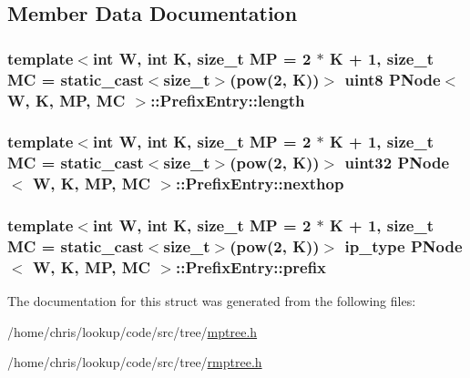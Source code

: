 \subsection{Member Data Documentation}
\hypertarget{structPNode_1_1PrefixEntry_a30104944f87b14734351ee8ce997707a}{
\subsubsection[{length}]{\setlength{\rightskip}{0pt plus 5cm}template$<$int W, int K, size\-\_\-t M\-P = 2 $\ast$ K + 1, size\-\_\-t M\-C = static\-\_\-cast$<$size\-\_\-t$>$(pow(2, K))$>$ {\bf uint8} {\bf P\-Node}$<$ {\bf W}, K, M\-P, M\-C $>$\-::Prefix\-Entry\-::length}}\label{structPNode_1_1PrefixEntry_a30104944f87b14734351ee8ce997707a}
\hypertarget{structPNode_1_1PrefixEntry_a7b474c22c07ee8f34aa0a18b06716a3a}{
\subsubsection[{nexthop}]{\setlength{\rightskip}{0pt plus 5cm}template$<$int W, int K, size\-\_\-t M\-P = 2 $\ast$ K + 1, size\-\_\-t M\-C = static\-\_\-cast$<$size\-\_\-t$>$(pow(2, K))$>$ {\bf uint32} {\bf P\-Node}$<$ {\bf W}, K, M\-P, M\-C $>$\-::Prefix\-Entry\-::nexthop}}\label{structPNode_1_1PrefixEntry_a7b474c22c07ee8f34aa0a18b06716a3a}
\hypertarget{structPNode_1_1PrefixEntry_a1e9bf615fce09a1d84c2a41993548da8}{
\subsubsection[{prefix}]{\setlength{\rightskip}{0pt plus 5cm}template$<$int W, int K, size\-\_\-t M\-P = 2 $\ast$ K + 1, size\-\_\-t M\-C = static\-\_\-cast$<$size\-\_\-t$>$(pow(2, K))$>$ {\bf ip\-\_\-type} {\bf P\-Node}$<$ {\bf W}, K, M\-P, M\-C $>$\-::Prefix\-Entry\-::prefix}}\label{structPNode_1_1PrefixEntry_a1e9bf615fce09a1d84c2a41993548da8}


The documentation for this struct was generated from the following files\-:\begin{DoxyCompactItemize}
\item 
/home/chris/lookup/code/src/tree/\hyperlink{mptree_8h}{mptree.\-h}\item 
/home/chris/lookup/code/src/tree/\hyperlink{rmptree_8h}{rmptree.\-h}\end{DoxyCompactItemize}
